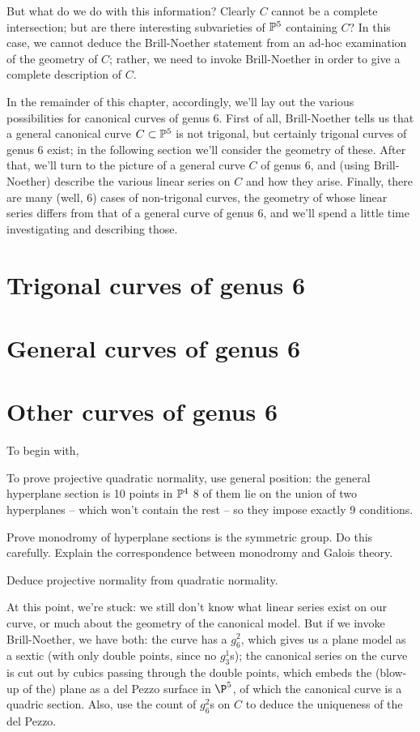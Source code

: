 But what do we do with this information? Clearly $C$ cannot be a complete intersection; but are there interesting subvarieties of $\PP^5$ containing $C$? In this case, we cannot deduce the Brill-Noether statement from an ad-hoc examination of the geometry of $C$; rather, we need to invoke Brill-Noether in order to give a complete description of $C$.

In the remainder of this chapter, accordingly, we'll lay out the various possibilities for canonical curves of genus 6. First of all,  Brill-Noether tells us that a general canonical curve $C \subset \PP^5$ is not trigonal, but certainly trigonal curves of genus 6 exist; in the following section we'll consider the geometry of these. After that, we'll turn to the picture of a general curve $C$ of genus 6, and (using Brill-Noether) describe the various linear series on $C$ and how they arise. Finally, there are many (well, 6) cases of non-trigonal curves, the geometry of whose linear series differs from that of a general curve of genus 6, and we'll spend a little time investigating and describing those.


\section{Trigonal curves of genus 6}

\section{General curves of genus 6}

\section{Other curves of genus 6}


To begin with,

To prove projective quadratic normality,  use general position: the general hyperplane section is 10 points in $\PP^4$ 8 of them lie on the union of two hyperplanes -- which won't contain the rest -- so they impose exactly 9 conditions. 

Prove monodromy of hyperplane sections is the symmetric group. Do this carefully. Explain the correspondence between monodromy and Galois theory. 

Deduce projective normality from quadratic normality.

At this point, we're stuck: we still don't know what linear series exist on our curve, or much about the geometry of the canonical model. But if we invoke Brill-Noether, we have both: the curve has a $g^2_6$, which gives us a plane model as a sextic (with only double points, since no $g^1_3$s); the canonical series on the curve is cut out by cubics passing through the double points, which embeds the (blow-up of the) plane as a del Pezzo surface in $\P^5$, of which the canonical curve is a quadric section. Also, use the count of $g^2_6$s on $C$ to deduce the uniqueness of the del Pezzo.




